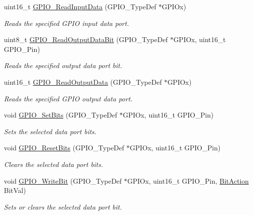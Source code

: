 \begin{DoxyCompactItemize}
uint16\-\_\-t \hyperlink{group___g_p_i_o_ga139a33adc8409288e9f193bbebb5a0f7}{G\-P\-I\-O\-\_\-\-Read\-Input\-Data} (G\-P\-I\-O\-\_\-\-Type\-Def $\ast$G\-P\-I\-Ox)
\begin{DoxyCompactList}\small\item\em Reads the specified G\-P\-I\-O input data port. \end{DoxyCompactList}\item 
uint8\-\_\-t \hyperlink{group___g_p_i_o_ga138270f8695b105b7c6ed405792919c1}{G\-P\-I\-O\-\_\-\-Read\-Output\-Data\-Bit} (G\-P\-I\-O\-\_\-\-Type\-Def $\ast$G\-P\-I\-Ox, uint16\-\_\-t G\-P\-I\-O\-\_\-\-Pin)
\begin{DoxyCompactList}\small\item\em Reads the specified output data port bit. \end{DoxyCompactList}\item 
uint16\-\_\-t \hyperlink{group___g_p_i_o_gaf8938a34280b7dc3e39872a7c17bb323}{G\-P\-I\-O\-\_\-\-Read\-Output\-Data} (G\-P\-I\-O\-\_\-\-Type\-Def $\ast$G\-P\-I\-Ox)
\begin{DoxyCompactList}\small\item\em Reads the specified G\-P\-I\-O output data port. \end{DoxyCompactList}\item 
void \hyperlink{group___g_p_i_o_ga9e1352eed7c6620e18af2d86f6b6ff8e}{G\-P\-I\-O\-\_\-\-Set\-Bits} (G\-P\-I\-O\-\_\-\-Type\-Def $\ast$G\-P\-I\-Ox, uint16\-\_\-t G\-P\-I\-O\-\_\-\-Pin)
\begin{DoxyCompactList}\small\item\em Sets the selected data port bits. \end{DoxyCompactList}\item 
void \hyperlink{group___g_p_i_o_ga6fcd35b207a66608dd2c9d7de9247dc8}{G\-P\-I\-O\-\_\-\-Reset\-Bits} (G\-P\-I\-O\-\_\-\-Type\-Def $\ast$G\-P\-I\-Ox, uint16\-\_\-t G\-P\-I\-O\-\_\-\-Pin)
\begin{DoxyCompactList}\small\item\em Clears the selected data port bits. \end{DoxyCompactList}\item 
void \hyperlink{group___g_p_i_o_ga8f7b237fd744d9f7456fbe0da47a9b80}{G\-P\-I\-O\-\_\-\-Write\-Bit} (G\-P\-I\-O\-\_\-\-Type\-Def $\ast$G\-P\-I\-Ox, uint16\-\_\-t G\-P\-I\-O\-\_\-\-Pin, \hyperlink{group___g_p_i_o_ga176130b21c0e719121470a6042d4cf19}{Bit\-Action} Bit\-Val)
\begin{DoxyCompactList}\small\item\em Sets or clears the selected data port bit. \end{DoxyCompactList}\item 

\end{DoxyCompactItemize}
